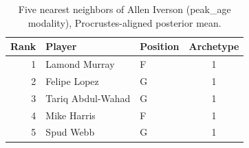 \begin{table}[htbp]
  \centering\small
  \begin{tabular}{rllc}
    \toprule
    Rank & Player & Position & Archetype \\
    \midrule
    1 & Lamond Murray & F & 1 \\
    2 & Felipe Lopez & G & 1 \\
    3 & Tariq Abdul-Wahad & G & 1 \\
    4 & Mike Harris & F & 1 \\
    5 & Spud Webb & G & 1 \\
    \bottomrule
  \end{tabular}
  \caption{Five nearest neighbors of Allen Iverson (peak_age modality), Procrustes-aligned posterior mean.}
  \label{tab:Allen_Iverson_neighbors_peak_age}
\end{table}

